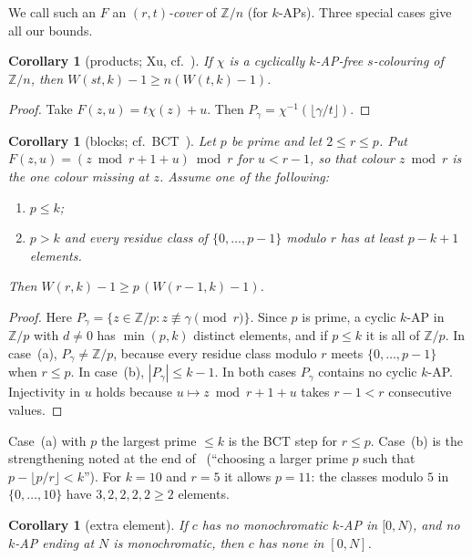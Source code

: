 \documentclass[11pt]{article}
\numberwithin{equation}{section}
\newtheorem{corollary}[theorem]{Corollary}
\theoremstyle{definition}
\theoremstyle{remark}
\newcommand{\Z}{\mathbb Z}
\newcommand{\W}{W}
\begin{document}
We call such an $F$ an \emph{$(r,t)$-cover} of $\Z/n$ (for $k$-APs).  Three special cases give
all our bounds.

\begin{corollary}[products; Xu, cf.~\cite{Mon25,Hun23}]\label{cor:product}
If $\chi$ is a cyclically $k$-AP-free $s$-colouring of $\Z/n$, then
$\W(st,k)-1\ge n(\W(t,k)-1)$.
\end{corollary}

\begin{proof}
Take $F(z,u)=t\chi(z)+u$.  Then $P_\gamma=\chi^{-1}(\lfloor\gamma/t\rfloor)$.
\end{proof}

\begin{corollary}[blocks; cf.~BCT~\cite{BCT18}]\label{cor:blocks}
Let $p$ be prime and let $2\le r\le p$.  Put
$F(z,u)=(z\bmod r+1+u)\bmod r$ for $u<r-1$, so that colour $z\bmod r$ is the one colour
\emph{missing} at $z$.  Assume one of the following:
\begin{enumerate}
\item[(a)] $p\le k$;
\item[(b)] $p>k$ and every residue class of $\{0,\dots,p-1\}$ modulo $r$ has at least $p-k+1$
  elements.
\end{enumerate}
Then $\W(r,k)-1\ge p\,(\W(r-1,k)-1)$.
\end{corollary}

\begin{proof}
Here $P_\gamma=\{z\in\Z/p: z\not\equiv\gamma \pmod r\}$.  Since $p$ is prime, a cyclic $k$-AP
in $\Z/p$ with $d\neq0$ has $\min(p,k)$ distinct elements, and if $p\le k$ it is all of $\Z/p$.
In case~(a), $P_\gamma\ne\Z/p$, because every residue class modulo $r$ meets
$\{0,\dots,p-1\}$ when $r\le p$.  In case~(b), $|P_\gamma|\le k-1$.  In both cases $P_\gamma$
contains no cyclic $k$-AP.  Injectivity in $u$ holds because $u\mapsto z\bmod r+1+u$ takes
$r-1<r$ consecutive values.
\end{proof}

Case~(a) with $p$ the largest prime $\le k$ is the BCT step for $r\le p$.  Case~(b) is the
strengthening noted at the end of~\cite[\S2]{BCT18} (``choosing a larger prime $p$ such that
$p-\lfloor p/r\rfloor<k$'').  For $k=10$ and $r=5$ it allows $p=11$: the classes modulo $5$ in
$\{0,\dots,10\}$ have $3,2,2,2,2\ge 2$ elements.

\begin{corollary}[extra element]\label{cor:extend}
If $c$ has no monochromatic $k$-AP in $[0,N)$, and no $k$-AP ending at $N$ is monochromatic, then
$c$ has none in $[0,N]$.
\end{corollary}
\end{document}
